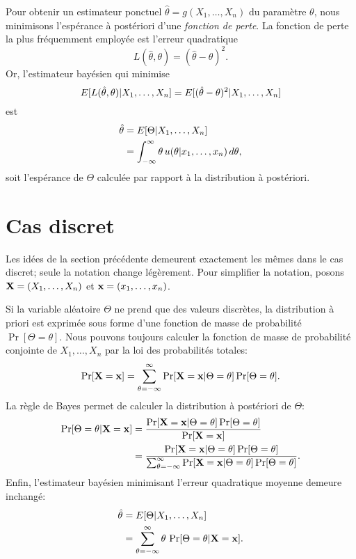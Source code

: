 Pour obtenir un estimateur ponctuel
$\hat{\theta} = g(X_1, \dots, X_n)$ du paramètre $\theta$, nous
minimisons l'espérance à postériori d'une \emph{fonction de perte}. La
fonction de perte la plus fréquemment employée est l'erreur
quadratique
\begin{equation*}
  L(\hat{\theta}, \theta) = (\hat{\theta} - \theta)^2.
\end{equation*}
Or, l'estimateur bayésien qui minimise
\begin{equation*}
  E [ L(\hat{\theta}, \theta)|X_1, \dots, X_n ] =
  E [ (\hat{\theta} - \theta)^2|X_1, \dots, X_n ]
\end{equation*}
est
\begin{align*}
  \hat{\theta}
  &= E [ \Theta|X_1, \dots, X_n ] \\
  &= \int_{-\infty}^\infty \theta\, u(\theta|x_1, \dots, x_n)\, d\theta,
\end{align*}
soit l'espérance de $\Theta$ calculée par rapport à la distribution à
postériori.


\section{Cas discret}
\label{sec:estimation-bayesienne:discret}

Les idées de la section précédente demeurent exactement les mêmes dans
le cas discret; seule la notation change légèrement. Pour simplifier
la notation, posons $\mathbf{X} = (X_1, \dots, X_n)$ et
$\mathbf{x} = (x_1, \dots, x_n)$.

Si la variable aléatoire $\Theta$ ne prend que des valeurs discrètes,
la distribution à priori est exprimée sous forme d'une fonction de
masse de probabilité $\Pr[\Theta = \theta]$. Nous pouvons toujours
calculer la fonction de masse de probabilité conjointe de
$X_1, \dots, X_n$ par la loi des probabilités totales:
\begin{equation*}
  \Pr[\mathbf{X} = \mathbf{x}]
  = \sum_{\theta=-\infty}^\infty
  \Pr[\mathbf{X} = \mathbf{x}|\Theta = \theta] \Pr[\Theta = \theta].
\end{equation*}
La règle de Bayes permet de calculer la distribution à postériori de
$\Theta$:
\begin{align*}
  \Pr[\Theta = \theta|\mathbf{X} = \mathbf{x}]
  &= \frac{\Pr[\mathbf{X} = \mathbf{x}|\Theta = \theta] \Pr[\Theta =
    \theta]}{\Pr[\mathbf{X} = \mathbf{x}]} \\
  &= \frac{\Pr[\mathbf{X} = \mathbf{x}|\Theta = \theta] \Pr[\Theta =
    \theta]}{\sum_{\theta=-\infty}^\infty \Pr[\mathbf{X} =
    \mathbf{x}|\Theta = \theta]
    \Pr[\Theta = \theta]}.
\end{align*}
Enfin, l'estimateur bayésien minimisant l'erreur quadratique moyenne
demeure inchangé:
\begin{align*}
  \hat{\theta}
  &= E\! \left[ \Theta|X_1, \dots, X_n \right] \\
  &= \sum_{\theta=-\infty}^\infty \theta\, \Pr[\Theta =
    \theta|\mathbf{X} = \mathbf{x}].
\end{align*}


